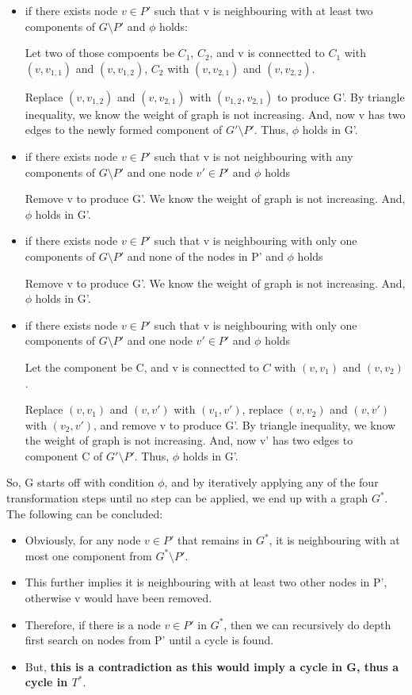 \documentclass[12pt]{article}
\begin{document}
\begin{enumerate}
\begin{itemize}
\item{if there exists node $v \in P'$ such that v is neighbouring with at least two components of $G \setminus P'$ and $\phi$ holds:}

Let two of those compoents be $C_{1}$, $C_{2}$, and v is connectted to $C_{1}$ with $(v, v_{1,1})$ and $(v, v_{1,2})$, $C_{2}$ with $(v, v_{2,1})$ and $(v, v_{2,2})$.

Replace $(v, v_{1,2})$ and $(v, v_{2,1})$ with $(v_{1,2}, v_{2,1})$ to produce G'. By triangle inequality, we know the weight of graph is not increasing. And, now v has two edges to the newly formed component of $G' \setminus P'$. Thus, $\phi$ holds in G'.

\item{if there exists node $v \in P'$ such that v is not neighbouring with any components of $G \setminus P'$ and one node $v' \in P'$ and $\phi$ holds}

Remove v to produce G'. We know the weight of graph is not increasing. And, $\phi$ holds in G'.

\item{if there exists node $v \in P'$ such that v is neighbouring with only one components of $G \setminus P'$ and none of the nodes in P' and $\phi$ holds}

Remove v to produce G'. We know the weight of graph is not increasing. And, $\phi$ holds in G'.

\item{if there exists node $v \in P'$ such that v is neighbouring with only one components of $G \setminus P'$ and one node $v' \in P'$ and $\phi$ holds}

Let the component be C, and v is connectted to $C$ with $(v, v_{1})$ and $(v, v_{2})$.

Replace $(v, v_{1})$ and $(v, v')$ with $(v_{1}, v')$, replace $(v, v_{2})$ and $(v, v')$ with $(v_{2}, v')$, and remove v to produce G'. By triangle inequality, we know the weight of graph is not increasing. And, now v' has two edges to component C of $G' \setminus P'$. Thus, $\phi$ holds in G'.
\end{itemize}

So, G starts off with condition $\phi$, and by iteratively applying any of the four transformation steps until no step can be applied, we end up with a graph $G^{*}$. The following can be concluded:
\begin{itemize}
\item{} Obviously, for any node $v \in P'$ that remains in $G^{*}$, it is neighbouring with at most one component from $G^{*} \setminus P'$.
\item{} This further implies it is neighbouring with at least two other nodes in P', otherwise v would have been removed.
\item{} Therefore, if there is a node $v \in P'$ in $G^{*}$, then we can recursively do depth first search on nodes from P' until a cycle is found.
\item{} But, \textbf{this is a contradiction as this would imply a cycle in G, thus a cycle in $T^{*}$}.
\end{itemize}


\end{enumerate}
\end{document}
